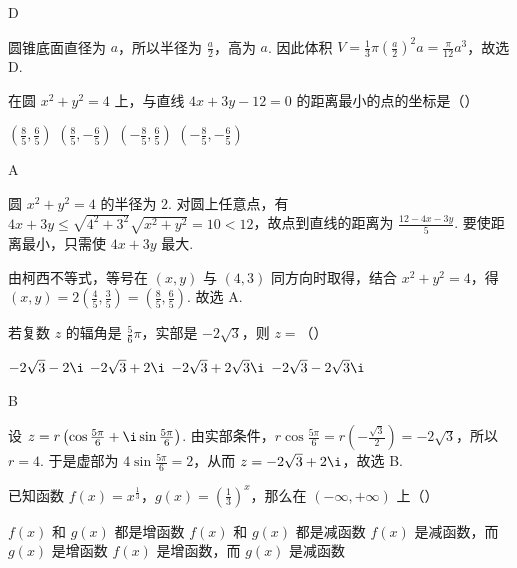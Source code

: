 \documentclass[UTF8,a4paper,oneside,11pt]{ctexbook}
\begin{document}
\begin{answer}D\end{answer}

\begin{solution}
圆锥底面直径为 \(a\)，所以半径为 \(\frac a2\)，高为 \(a\). 因此体积 \(V=\frac13\pi\left(\frac a2\right)^{2}a=\frac\pi{12}a^{3}\)，故选 D.
\end{solution}

\begin{problem}
在圆 \(x^{2}+y^{2}=4\) 上，与直线 \(4x+3y-12=0\) 的距离最小的点的坐标是（\quad）

\choices
{\(\left(\frac85,\frac65\right)\)}
{\(\left(\frac85,-\frac65\right)\)}
{\(\left(-\frac85,\frac65\right)\)}
{\(\left(-\frac85,-\frac65\right)\)}
\end{problem}

\begin{answer}A\end{answer}

\begin{solution}
圆 \(x^{2}+y^{2}=4\) 的半径为 \(2\). 对圆上任意点，有 \(4x+3y\leqslant\sqrt{4^{2}+3^{2}}\sqrt{x^{2}+y^{2}}=10<12\)，故点到直线的距离为 \(\frac{12-4x-3y}{5}\). 要使距离最小，只需使 \(4x+3y\) 最大.

由柯西不等式，等号在 \((x,y)\) 与 \((4,3)\) 同方向时取得，结合 \(x^{2}+y^{2}=4\)，得 \((x,y)=2\left(\frac45,\frac35\right)=\left(\frac85,\frac65\right)\). 故选 A.
\end{solution}

\begin{problem}
若复数 \(z\) 的辐角是 \(\frac56\pi\)，实部是 \(-2\sqrt3\)，则 \(z=\)（\quad）

\choices
{\(-2\sqrt3-2\i\)}
{\(-2\sqrt3+2\i\)}
{\(-2\sqrt3+2\sqrt3\i\)}
{\(-2\sqrt3-2\sqrt3\i\)}
\end{problem}

\begin{answer}B\end{answer}

\begin{solution}
设 \(z=r\left(\cos\frac{5\pi}{6}+\i\sin\frac{5\pi}{6}\right)\). 由实部条件，\(r\cos\frac{5\pi}{6}=r\left(-\frac{\sqrt3}{2}\right)=-2\sqrt3\)，所以 \(r=4\). 于是虚部为 \(4\sin\frac{5\pi}{6}=2\)，从而 \(z=-2\sqrt3+2\i\)，故选 B.
\end{solution}

\begin{problem}
已知函数 \(f(x)=x^{\frac13}\)，\(g(x)=\left(\frac13\right)^x\)，那么在 \((-\infty,+\infty)\) 上（\quad）

\choices
{\(f(x)\) 和 \(g(x)\) 都是增函数}
{\(f(x)\) 和 \(g(x)\) 都是减函数}
{\(f(x)\) 是减函数，而 \(g(x)\) 是增函数}
{\(f(x)\) 是增函数，而 \(g(x)\) 是减函数}
\end{problem}
\end{document}
